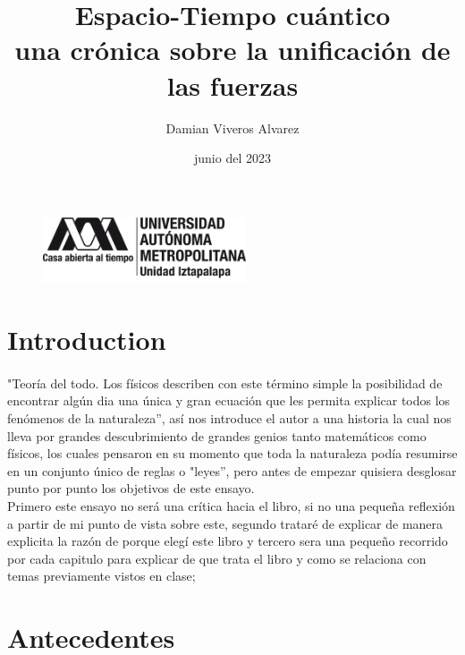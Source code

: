 \documentclass[12pt]{article}
\title{\textsf{Espacio-Tiempo cuántico\\
una crónica sobre la unificación de las fuerzas}}
\date{junio del 2023}
\author{Damian Viveros Alvarez}
\begin{document}
\begin{figure}
    \includegraphics[width=60mm]{uam.png}
    \raggedleft
\end{figure}
\maketitle{}
\section*{Introduction}
\paragraph*{}
\textsf{"Teoría del todo. Los físicos describen con este término simple la posibilidad de encontrar algún dia una única y gran ecuación 
que les permita explicar todos los fenómenos de la naturaleza'', así nos introduce el autor a una historia la cual nos lleva por grandes 
descubrimiento de grandes genios tanto matemáticos como físicos, los cuales pensaron en su momento que toda la naturaleza podía resumirse en un conjunto único de reglas o "leyes'',
pero antes de empezar quisiera desglosar punto por punto los objetivos de este ensayo.\\ Primero este ensayo no será una crítica
hacia el libro, si no una pequeña reflexión a partir de mi punto de vista sobre este, segundo trataré de explicar de manera
explicita la razón de porque elegí este libro y tercero sera una pequeño recorrido por cada capitulo para explicar de que trata
el libro y como se relaciona con temas previamente vistos en clase;}
\section*{Antecedentes}
\end{document}
